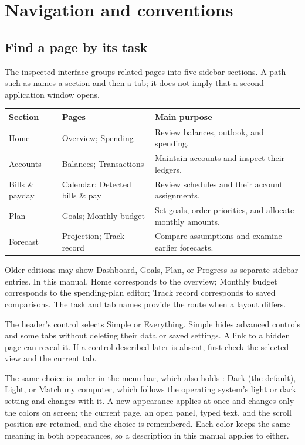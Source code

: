 \chapter{Navigation and conventions}\label{ch:conventions}
\section{Find a page by its task}
The inspected interface groups related pages into five sidebar sections. A path such as  names a section and then a tab; it does not imply that a second application window opens.

\begin{tabularx}{\textwidth}{@{}lYY@{}}
\toprule Section & Pages & Main purpose\\\midrule
Home & Overview; Spending & Review balances, outlook, and spending.\\
Accounts & Balances; Transactions & Maintain accounts and inspect their ledgers.\\
Bills \& payday & Calendar; Detected bills \& pay & Review schedules and their account assignments.\\
Plan & Goals; Monthly budget & Set goals, order priorities, and allocate monthly amounts.\\
Forecast & Projection; Track record & Compare assumptions and examine earlier forecasts.\\
\bottomrule
\end{tabularx}

Older editions may show Dashboard, Goals, Plan, or Progress as separate sidebar entries. In this manual, Home corresponds to the overview; Monthly budget corresponds to the spending-plan editor; Track record corresponds to saved comparisons. The task and tab names provide the route when a layout differs.

The header's  control selects Simple or Everything. Simple hides advanced controls and some tabs without deleting their data or saved settings. A link to a hidden page can reveal it. If a control described later is absent, first check the selected view and the current tab.

The same choice is under  in the menu bar, which also holds : Dark (the default), Light, or Match my computer, which follows the operating system's light or dark setting and changes with it. A new appearance applies at once and changes only the colors on screen; the current page, an open panel, typed text, and the scroll position are retained, and the choice is remembered. Each color keeps the same meaning in both appearances, so a description in this manual applies to either.

